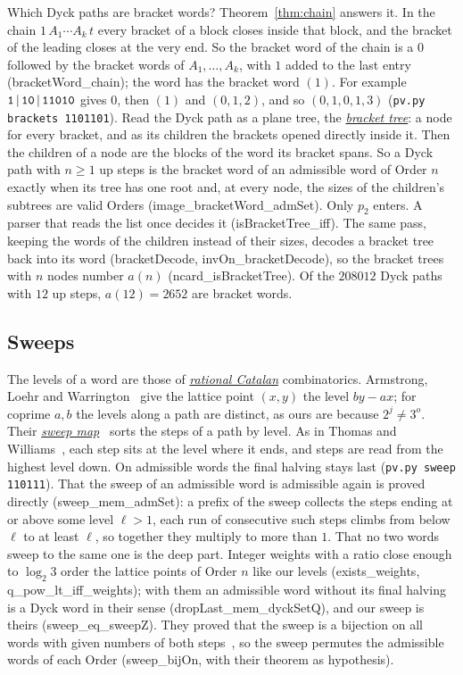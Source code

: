 \documentclass[10pt,a4paper,titlepage]{article}
\makeatletter
\newcommand{\termhere}[1]{\leavevmode
  \Hy@raisedlink{\hyper@anchorstart{term:#1}\hyper@anchorend}}
\newcommand{\keyterm}[2]{\hyperlink{box:#1}{\emph{#2}}}
\newcommand{\lean}[1]{\textsf{#1}}
\newcommand{\pv}[1]{\texttt{pv.py #1}}
\makeatother
\begin{document}
Which Dyck paths are bracket words? Theorem~\ref{thm:chain} answers it. In the
chain $1\,A_1 \cdots A_k\,t$ every bracket of a block closes inside that block,
and the bracket of the leading  closes at the very end. So the bracket word
of the chain is a $0$ followed by the bracket words of $A_1, \dots, A_k$, with $1$
added to the last entry (\lean{bracketWord\_chain}); the word  has the
bracket word $(1)$. For example $\text{\texttt{1}}\,|\,\text{\texttt{10}}\,|\,\text{\texttt{11010}}$ gives $0$, then
$(1)$ and $(0, 1, 2)$, and so $(0, 1, 0, 1, 3)$ (\pv{brackets 1101101}).
\termhere{brackettree}Read the Dyck path as a plane
tree, the \keyterm{brackettree}{bracket tree}: a node for every bracket, and as its children
the brackets opened directly inside it. Then the children of a node are the
blocks of the word its bracket spans. So a Dyck path with $n \ge 1$ up steps is the
bracket word of an admissible word of Order $n$ exactly when its tree has one
root and, at every node, the sizes of the children's subtrees are valid Orders
(\lean{image\_bracketWord\_admSet}). Only $p_2$ enters. A parser that reads the
list once decides it (\lean{isBracketTree\_iff}). The same
pass, keeping the words of the children instead of their sizes, decodes a bracket
tree back into its word (\lean{bracketDecode}, \lean{invOn\_bracketDecode}), so
the bracket trees with $n$ nodes number $a(n)$ (\lean{ncard\_isBracketTree}). Of the
$208012$ Dyck paths with $12$ up steps, $a(12) = 2652$ are bracket words.

\subsection*{Sweeps}
\label{sec:sweeps}
\termhere{ratcatalan}\termhere{sweepmap}The levels of a word are those of \keyterm{ratcatalan}{rational Catalan} combinatorics. Armstrong, Loehr and
Warrington~\cite{ALW2014} give the lattice point $(x, y)$ the level $by - ax$;
for coprime $a, b$ the levels along a path are distinct, as ours are because
$2^j \ne 3^o$. Their \keyterm{sweepmap}{sweep map}~\cite{ALW2015} sorts the steps of a path by level. As in
Thomas and Williams~\cite{ThomasWilliams2018}, each step sits at the level where it
ends, and steps are read from the highest level down. On admissible words the
final halving stays last (\pv{sweep 110111}). That the sweep of an admissible word is
admissible again is proved directly
(\lean{sweep\_mem\_admSet}): a prefix of the sweep collects the steps ending at or
above some level $\ell > 1$, each run of consecutive such steps climbs from below $\ell$
to at least $\ell$, so together they multiply to more than $1$. That no two words
sweep to the same one is the deep part. Integer weights with a ratio close enough to $\log_2 3$
order the lattice points of Order $n$ like our levels
(\lean{exists\_weights}, \lean{q\_pow\_lt\_iff\_weights}); with them an admissible word without its final halving is
a Dyck word in their sense (\lean{dropLast\_mem\_dyckSetQ}), and our sweep is theirs (\lean{sweep\_eq\_sweepZ}).
They proved that the sweep is a bijection on all words with given
numbers of both steps~\cite[Thm.~6.3]{ThomasWilliams2018}, so the sweep permutes the admissible
words of each Order (\lean{sweep\_bijOn}, with their theorem as hypothesis).
\end{document}
